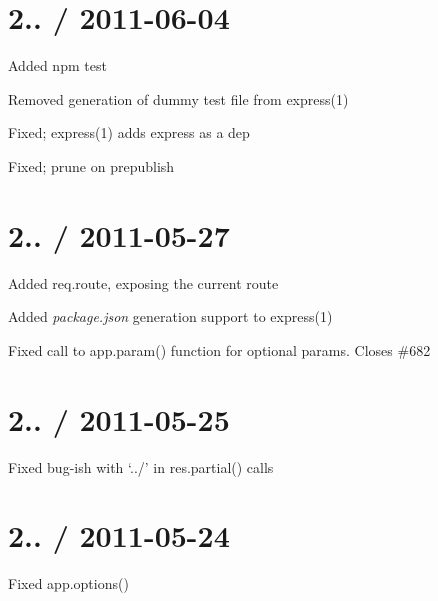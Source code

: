 {\ttfamily \section*{2.. / 2011-\/06-\/04 }}

{\ttfamily }

{\ttfamily 
\begin{DoxyItemize}
\item Added {\ttfamily npm test}
\item Removed generation of dummy test file from {\ttfamily express(1)}
\item Fixed; {\ttfamily express(1)} adds express as a dep
\item Fixed; prune on {\ttfamily prepublish}
\end{DoxyItemize}}

{\ttfamily \section*{2.. / 2011-\/05-\/27 }}

{\ttfamily }

{\ttfamily 
\begin{DoxyItemize}
\item Added {\ttfamily req.\+route}, exposing the current route
\item Added {\itshape package.\+json} generation support to {\ttfamily express(1)}
\item Fixed call to {\ttfamily app.\+param()} function for optional params. Closes \#682
\end{DoxyItemize}}

{\ttfamily \section*{2.. / 2011-\/05-\/25 }}

{\ttfamily }

{\ttfamily 
\begin{DoxyItemize}
\item Fixed bug-\/ish with `../' in {\ttfamily res.\+partial()} calls
\end{DoxyItemize}}

{\ttfamily \section*{2.. / 2011-\/05-\/24 }}

{\ttfamily }

{\ttfamily 
\begin{DoxyItemize}
\item Fixed {\ttfamily app.\+options()}
\end{DoxyItemize}}

